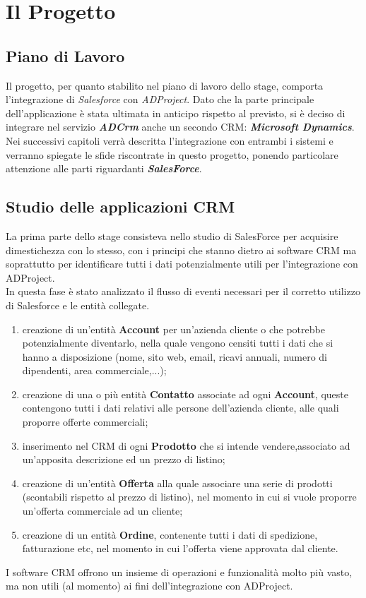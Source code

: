 \documentclass[12pt,a4paper,twoside,openany,english]{book}
\begin{document}
\chapter{Il Progetto}\label{introduzione}
	\section{Piano di Lavoro}
		Il progetto, per quanto stabilito nel piano di lavoro dello stage, comporta l'integrazione di \textit{Salesforce} con \textit{ADProject}. Dato che la parte principale dell'applicazione è stata ultimata in anticipo rispetto al previsto, si è deciso di integrare nel servizio \textit{\textbf{ADCrm}} anche un secondo CRM: \textit{\textbf{Microsoft Dynamics}}.\\
		Nei successivi capitoli verrà descritta l'integrazione con entrambi i sistemi e verranno spiegate le sfide riscontrate in questo progetto, ponendo particolare attenzione alle parti riguardanti \textit{\textbf{SalesForce}}.
	\section{Studio delle applicazioni CRM}
		La prima parte dello stage consisteva nello studio di SalesForce per  acquisire dimestichezza con lo stesso, con i principi che stanno dietro ai software CRM ma soprattutto per identificare tutti i dati potenzialmente utili per l'integrazione con ADProject.\\
		In questa fase è stato analizzato il flusso di eventi necessari per il corretto utilizzo di Salesforce e le entità collegate.		
		\begin{enumerate}
			\item creazione di un'entità \textbf{Account} per un'azienda cliente o che potrebbe potenzialmente diventarlo, nella quale vengono censiti tutti i dati che si hanno a disposizione (nome, sito web, email, ricavi annuali, numero di dipendenti, area commerciale,...);
			\item creazione di una o più entità \textbf{Contatto} associate ad ogni \textbf{Account}, queste contengono tutti i dati relativi alle persone dell'azienda cliente, alle quali proporre offerte commerciali;
			\item inserimento nel CRM di ogni \textbf{Prodotto} che si intende vendere,associato ad un'apposita descrizione ed un prezzo di listino;
			\item creazione di un'entità \textbf{Offerta} alla quale associare una serie di prodotti (scontabili rispetto al prezzo di listino), nel momento in cui si vuole proporre un'offerta commerciale ad un cliente;
			\item creazione di un entità \textbf{Ordine}, contenente tutti i dati di spedizione, fatturazione etc, nel momento in cui l'offerta viene approvata dal cliente.
		\end{enumerate}
		I software CRM offrono un insieme di operazioni e funzionalità molto più vasto, ma non utili (al momento) ai fini dell'integrazione con ADProject.\\
\end{document}
